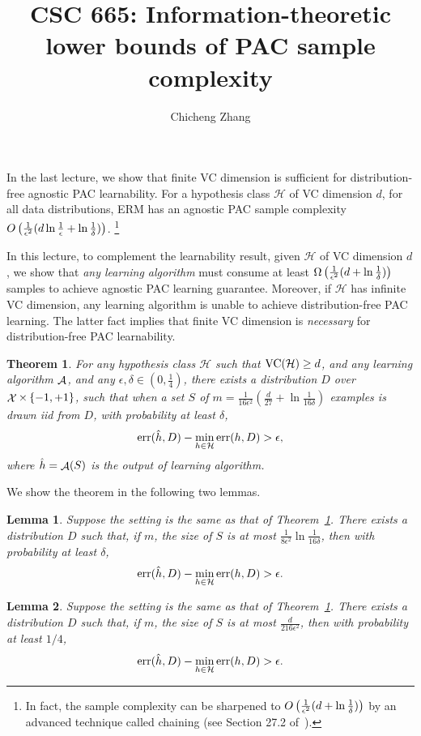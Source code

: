 \documentclass{article}
\title{CSC 665: Information-theoretic lower bounds of PAC sample complexity}
\author{Chicheng Zhang}
\newtheorem{theorem}{Theorem}
\newtheorem{lemma}{Lemma}
\DeclareMathOperator*{\err}{{\rm err}}
\DeclareMathOperator*{\Xcal}{{\cal X}}
\DeclareMathOperator*{\Acal}{{\cal A}}
\DeclareMathOperator*{\VC}{{\rm VC}}
\newcommand{\Hcal}{\mathcal{H}}
\begin{document}
\maketitle

In the last lecture, we show that finite VC dimension is
sufficient for distribution-free agnostic PAC learnability.
For a hypothesis class $\Hcal$
of VC dimension $d$, for all data distributions,
ERM has an agnostic PAC sample complexity
$O\del{\frac{1}{\epsilon^2}(d \ln\frac1\epsilon + \ln\frac1\delta)}$.
\footnote{In fact, the sample complexity can be sharpened to
$O\del{\frac{1}{\epsilon^2}(d + \ln\frac1\delta)}$ by an
advanced technique called chaining (see Section 27.2
of~\cite{shalev2014understanding}).}

In this lecture, to complement the learnability result, given $\Hcal$
of VC dimension $d$,
we show that {\em any learning algorithm} must consume at least
$\Omega\del{\frac{1}{\epsilon^2}(d + \ln\frac1\delta)}$ samples to achieve agnostic
PAC learning guarantee. Moreover, if $\Hcal$ has infinite VC dimension,
any learning algorithm is unable to achieve distribution-free PAC learning.
The latter fact implies that finite VC dimension is {\em necessary} for
distribution-free PAC learnability.

\begin{theorem}
For any hypothesis class $\Hcal$ such that $\VC(\Hcal)\geq d$,
and any learning algorithm $\Acal$, and any $\epsilon,\delta \in (0,\frac14)$,
there exists a distribution $D$ over $\Xcal \times \cbr{-1,+1}$, such that
when a set $S$ of $m = \frac{1}{16\epsilon^2}(\frac{d}{27} + \ln\frac1{16\delta})$ examples is drawn iid from
$D$, with probability at least $\delta$,
\[ \err(\hat{h}, D) - \min_{h \in \Hcal} \err(h, D) > \epsilon, \]
where $\hat{h} = \Acal(S)$ is the output of learning algorithm.
\label{thm:lb}
\end{theorem}

We show the theorem in the following two lemmas.

\begin{lemma}
Suppose the setting is the same as that of Theorem~\ref{thm:lb}. There exists
a distribution $D$ such that, if $m$,
the size of $S$ is at most $\frac{1}{8\epsilon^2}\ln\frac1{16\delta}$,
then with probability at least $\delta$,
\[ \err(\hat{h}, D) - \min_{h \in \Hcal} \err(h, D) > \epsilon. \]
\label{lem:delta}
\end{lemma}

\begin{lemma}
Suppose the setting is the same as that of Theorem~\ref{thm:lb}. There exists
a distribution $D$ such that, if $m$,
the size of $S$ is at most $\frac{d}{216\epsilon^2}$, then with probability at least
$1/4$,
\[ \err(\hat{h}, D) - \min_{h \in \Hcal} \err(h, D) > \epsilon. \]
\label{lem:d}
\end{lemma}
\end{document}
